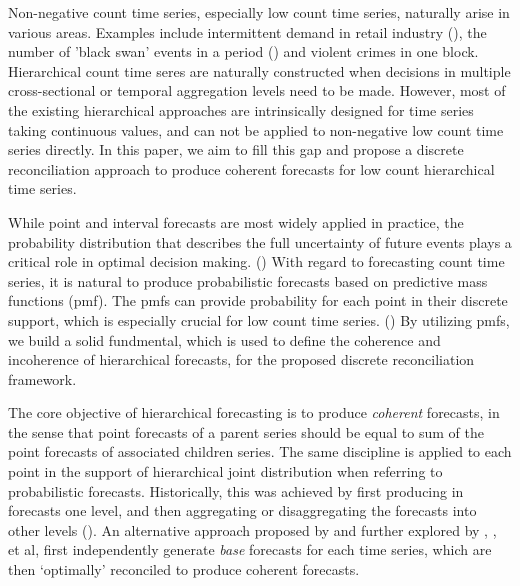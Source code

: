 \documentclass[a4paper,review,12pt,authoryear]{elsarticle}
\begin{document}
Non-negative count time series, especially low count time series, naturally arise in various areas. 
Examples include intermittent demand in retail industry (\citealp{kourentzesElucidateStructureIntermittent2021}), the number of 'black swan' events in a period (\citealp{nikolopoulosWeNeedTalk2020}) and violent crimes in one block.
Hierarchical count time seres are naturally constructed when decisions in multiple cross-sectional or temporal aggregation levels need to be made.
However, most of the existing hierarchical approaches are intrinsically designed for time series taking continuous values, and can not be applied to non-negative low count time series directly. 
In this paper, we aim to fill this gap and propose a discrete reconciliation approach to produce coherent forecasts for low count hierarchical time series.

While point and interval forecasts are most widely applied in practice, 
the probability distribution that describes the full uncertainty of future events plays a critical role in optimal decision making. (\citealp{gneitingProbabilisticForecasting2014}) 
With regard to forecasting count time series, it is natural to produce probabilistic forecasts based on predictive mass functions (pmf). 
The pmfs can provide probability for each point in their discrete support,
which is especially crucial for low count time series. (\citealp{petropoulosForecastingTheoryPractice2022a})
By utilizing pmfs, we build a solid fundmental, which is used to define the coherence and incoherence of hierarchical forecasts, for the proposed discrete reconciliation framework.

The core objective of hierarchical forecasting is to produce \textit{coherent} forecasts, 
in the sense that point forecasts of a parent series should be equal to sum of the point forecasts of associated children series. 
The same discipline is applied to each point in the support of hierarchical joint distribution when referring to probabilistic forecasts.
Historically, this was achieved by first producing in forecasts one level, 
and then aggregating or disaggregating the forecasts into other levels (\citealp{fliednerHierarchicalForecastingIssues2001}). 
An alternative approach proposed by \cite{hyndmanOptimalCombinationForecasts2011} and further explored by \cite{wickramasuriyaOptimalForecastReconciliation2019}, \cite{ anagiotelisForecastReconciliationGeometric2021}, et al, 
first independently generate \textit{base} forecasts for each time series, 
which are then `optimally' reconciled to produce coherent forecasts.
\end{document}
